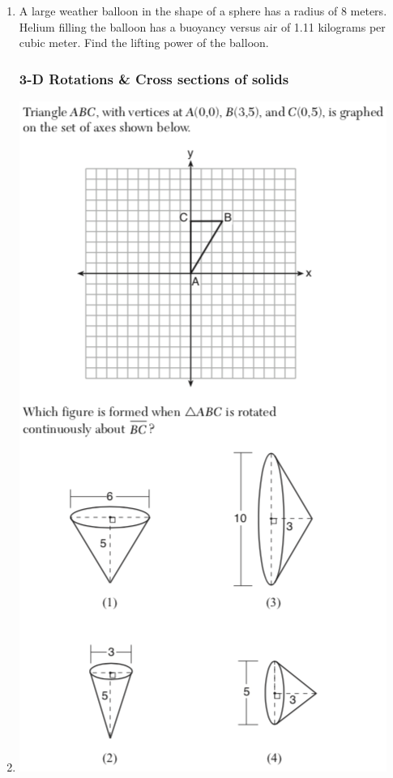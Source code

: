\documentclass[12pt, twoside]{article}
\begin{document}
\begin{enumerate}
 \item A large weather balloon in the shape of a sphere has a radius of 8 meters. Helium filling the balloon has a buoyancy versus air of 1.11 kilograms per cubic meter. Find the lifting power of the balloon.  \vspace{3cm}

\newpage
\subsubsection*{3-D Rotations \& Cross sections of solids}
\item %
    \includegraphics[scale=0.75]{triangle_3d_rotation_JN2018.png}


\end{enumerate}
\end{document}

